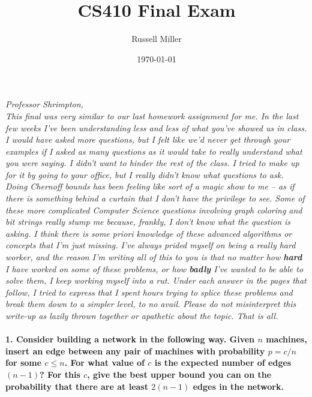 \documentclass{article}
\title{CS410 Final Exam}
\author{Russell Miller}
\date{\today}
\begin{document}
\maketitle

\emph{Professor Shrimpton,\\
This final was very similar to our last homework assignment for me. In the last 
few
weeks I've been understanding less and less of what you've showed us in class.
I would have asked more questions, but I felt like we'd never get through your
examples if I asked as many questions as it would take to really understand
what you were saying. I didn't want to hinder the rest of the class. I tried
to make up for it by going to your office, but I really didn't know what 
questions to ask. Doing Chernoff bounds has been feeling like sort of a magic
show to me -- as if there is something behind a curtain that I don't have the
privilege to see. Some of these more complicated Computer Science questions
involving graph coloring and bit strings really stump me because, frankly,
I don't know what the question is asking. I think there is some priori
knowledge of these advanced algorithms or concepts that I'm just missing.
I've always prided myself on being a really hard worker, and the reason I'm
writing all of this to you is that no matter how \textbf{hard} I have worked
on some of these problems, or how \textbf{badly} I've wanted to be able to
solve them, I keep working myself into a rut. Under each answer in the pages 
that follow, 
I tried to express that I spent
hours trying to splice these problems and break them down to a simpler level,
to no avail. Please do not misinterpret this write-up as lazily thrown together
or apathetic about the topic. That is all.}

\pagebreak

\paragraph{1. Consider building a network in the following way. Given $n$ 
machines, insert an edge between any pair of machines with probability $p = 
c/n$ for some $c \leq n$. For what value of $c$ is the expected number of edges 
$(n - 1)$? For this $c$, give the best upper bound you can on the probability 
that there are at least $2(n - 1)$ edges in the network.\\\\}
\end{document}
